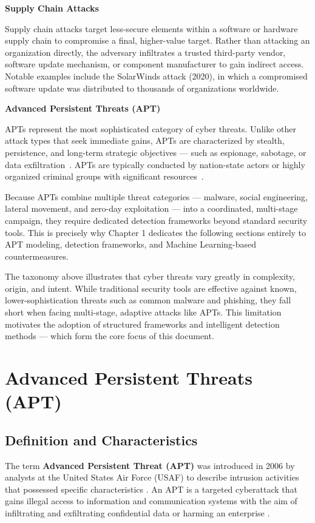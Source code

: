 \textbf{Supply Chain Attacks}\par
Supply chain attacks target less-secure elements within a software or hardware supply chain to compromise a final, higher-value target. Rather than attacking an organization directly, the adversary infiltrates a trusted third-party vendor, software update mechanism, or component manufacturer to gain indirect access. Notable examples include the SolarWinds attack (2020), in which a compromised software update was distributed to thousands of organizations worldwide.

\textbf{Advanced Persistent Threats (APT)}\par
APTs represent the most sophisticated category of cyber threats. Unlike other attack types that seek immediate gains, APTs are characterized by stealth, persistence, and long-term strategic objectives --- such as espionage, sabotage, or data exfiltration~\cite{krishnapriya2024comprehensive}. APTs are typically conducted by nation-state actors or highly organized criminal groups with significant resources~\cite{crowdstrike2024apt}.

Because APTs combine multiple threat categories --- malware, social engineering, lateral movement, and zero-day exploitation --- into a coordinated, multi-stage campaign, they require dedicated detection frameworks beyond standard security tools. This is precisely why Chapter 1 dedicates the following sections entirely to APT modeling, detection frameworks, and Machine Learning-based countermeasures.

The taxonomy above illustrates that cyber threats vary greatly in complexity, origin, and intent. While traditional security tools are effective against known, lower-sophistication threats such as common malware and phishing, they fall short when facing multi-stage, adaptive attacks like APTs. This limitation motivates the adoption of structured frameworks and intelligent detection methods --- which form the core focus of this document.

\section{Advanced Persistent Threats (APT)}
\subsection{Definition and Characteristics}
The term \textbf{Advanced Persistent Threat (APT)} was introduced in 2006 by analysts at the United States Air Force (USAF) to describe intrusion activities that possessed specific characteristics \cite{singh2016comprehensive}. An APT is a targeted cyberattack that gains illegal access to information and communication systems with the aim of infiltrating and exfiltrating confidential data or harming an enterprise \cite{krishnapriya2024comprehensive}.

